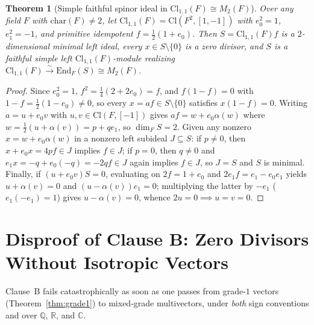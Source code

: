 \documentclass[11pt]{article}
\newtheorem{theorem}{Theorem}[section]
\theoremstyle{definition}
\newcommand{\Cl}{\mathrm{Cl}}
\newcommand{\End}{\mathrm{End}}
\begin{document}
\begin{theorem}[Simple faithful spinor ideal in $\Cl_{1,1}(F) \cong M_2(F)$]
\label{thm:cl11}
Over any field $F$ with $\mathrm{char}(F) \neq 2$, let $\Cl_{1,1}(F) = \Cl(F^2, [1, -1])$
with $e_0^2 = 1$, $e_1^2 = -1$, and primitive idempotent $f = \frac{1}{2}(1 + e_0)$.
Then $S = \Cl_{1,1}(F) f$ is a $2$-dimensional minimal left ideal, every
$x \in S \setminus \{0\}$ is a zero divisor, and $S$ is a faithful simple left
$\Cl_{1,1}(F)$-module realizing $\Cl_{1,1}(F) \xrightarrow{\sim} \End_F(S) \cong M_2(F)$.
\end{theorem}
\begin{proof}
Since $e_0^2 = 1$, $f^2 = \frac{1}{4}(2 + 2e_0) = f$, and $f(1 - f) = 0$ with
$1 - f = \frac{1}{2}(1 - e_0) \neq 0$, so every $x = af \in S \setminus \{0\}$
satisfies $x(1 - f) = 0$. Writing $a = u + e_0 v$ with $u, v \in \Cl(F, [-1])$ gives
$af = w + e_0 \alpha(w)$ where $w = \frac{1}{2}(u + \alpha(v)) = p + q e_1$, so
$\dim_F S = 2$. Given any nonzero $x = w + e_0 \alpha(w)$ in a nonzero left
subideal $J \subseteq S$: if $p \neq 0$, then $x + e_0 x = 4p f \in J$ implies
$f \in J$; if $p = 0$, then $q \neq 0$ and $e_1 x = -q + e_0(-q) = -2q f \in J$
again implies $f \in J$, so $J = S$ and $S$ is minimal. Finally, if
$(u + e_0 v) S = 0$, evaluating on $2f = 1 + e_0$ and $2 e_1 f = e_1 - e_0 e_1$
yields $u + \alpha(v) = 0$ and $(u - \alpha(v))e_1 = 0$; multiplying the latter
by $-e_1$ ($e_1(-e_1) = 1$) gives $u - \alpha(v) = 0$, whence $2u = 0 \implies u = v = 0$.
\end{proof}

\section{Disproof of Clause B: Zero Divisors Without Isotropic Vectors}

Clause~B fails catastrophically as soon as one passes from grade-$1$ vectors
(Theorem~\ref{thm:grade1}) to mixed-grade multivectors, under \emph{both} sign
conventions and over $\mathbb{Q}$, $\mathbb{R}$, and $\mathbb{C}$.
\end{document}
